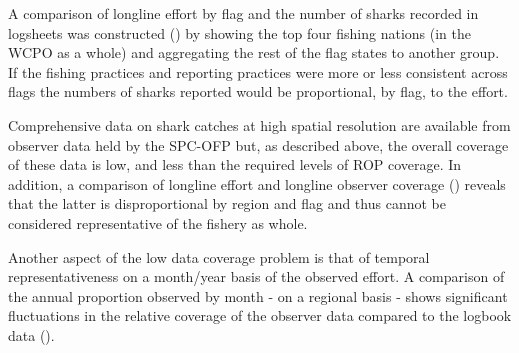 \documentclass[12pt]{SCreport}
\begin{document}
A comparison of longline effort by flag and the number of sharks recorded in logsheets was constructed () by showing the top four fishing nations (in the WCPO as a whole) and aggregating the rest of the flag states to another group. If the fishing practices and reporting practices were more or less consistent across flags the numbers of sharks reported would be proportional, by flag, to the effort.

Comprehensive data on shark catches at high spatial resolution are available from observer data held by the SPC-OFP but, as described above, the overall coverage of these data is low, and less than the required levels of ROP coverage. In addition, a comparison of longline effort and longline observer coverage () reveals that the latter is disproportional by region and flag and thus cannot be considered representative of the fishery as whole.

Another aspect of the low data coverage problem is that of temporal representativeness on a month/year basis of the observed effort. A comparison of the annual proportion observed by month - on a regional basis - shows significant fluctuations in the relative coverage of the observer data compared to the logbook data ().
\end{document}
